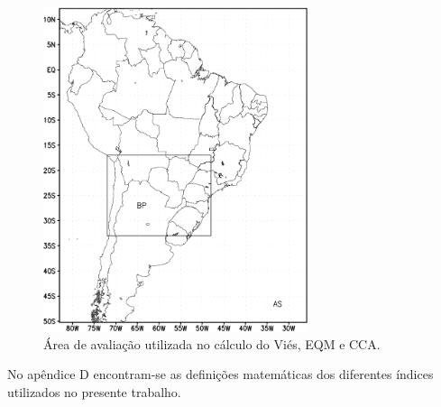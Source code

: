 \begin{figure}[!hpb]
\centering
\includegraphics[height=9.5cm]{./figs/area_aval.png}
\caption{Área de avaliação utilizada no cálculo do Viés, EQM e CCA.}
\label{fig09}
\end{figure}

No apêndice D encontram-se as definições matemáticas dos diferentes índices utilizados no presente trabalho.
